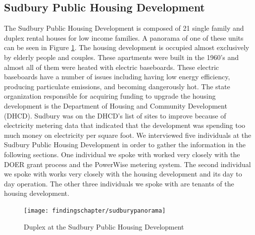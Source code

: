 \subsection{Sudbury Public Housing Development}
\par The Sudbury Public Housing Development is composed of 21 single family and duplex rental houses for low income families. A panorama of one of these units can be seen in Figure \ref{fig:sudburypano}. The housing development is occupied almost exclusively by elderly people and couples. These apartments were built in the 1960’s and almost all of them were heated with electric baseboards. These electric baseboards have a number of issues including having low energy efficiency, producing particulate emissions, and becoming dangerously hot. The state organization responsible for acquiring funding to upgrade the housing development is the Department of Housing and Community Development (DHCD). Sudbury was on the DHCD’s list of sites to improve because of electricity metering data that indicated that the development was spending too much money on electricity per square foot. We interviewed five individuals at the Sudbury Public Housing Development in order to gather the information in the following sections. One individual we spoke with worked very closely with the DOER grant process and the PowerWise metering system. The second individual we spoke with works very closely with the housing development and its day to day operation. The other three individuals we spoke with are tenants of the housing development.
\begin{figure}[H]
\centering
\texttt{[image: findingschapter/sudburypanorama]}
\caption{Duplex at the Sudbury Public Housing Development}
\label{fig:sudburypano}
\end{figure}

